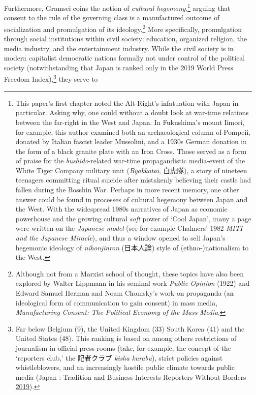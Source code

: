 \documentclass[10pt,british,A4paper,oneside]{memoir}
\begin{document}
Furthermore, Gramsci coins the notion of \emph{cultural
hegemony},\footnote{This paper's first chapter noted the Alt-Right's
  infatuation with Japan in particular. Asking why, one could without a
  doubt look at war-time relations between the far-right in the West and
  Japan. In Fukushima's mount Iimori, for example, this author examined
  both an archaeological column of Pompeii, donated by Italian fascist
  leader Mussolini, and a 1930s German donation in the form of a black
  granite plate with an Iron Cross. Those served as a form of praise for
  the \emph{bushido}-related war-time propagandistic media-event of the
  White Tiger Company military unit (\emph{Byakkotai}, 白虎隊), a story
  of nineteen teenagers committing ritual suicide after mistakenly
  believing their castle had fallen during the Bosshin War. Perhaps in
  more recent memory, one other answer could be found in processes of
  cultural hegemony between Japan and the West. With the widespread
  1980s narratives of Japan as economic powerhouse and the growing
  cultural \emph{soft} power of `Cool Japan', many a page were written
  on the \emph{Japanese model} (see for example Chalmers' 1982
  \emph{MITI and the Japanese Miracle}), and thus a window opened to
  sell Japan's hegemonic ideology of \emph{nihonjinron} (日本人論) style
  of (ethno-)nationalism to the West.} arguing that consent to the rule
of the governing class is a manufactured outcome of socialization and
promulgation of its ideology.\footnote{Although not from a Marxist
  school of thought, these topics have also been explored by Walter
  Lippmann in his seminal work \emph{Public Opinion} (1922) and Edward
  Samuel Herman and Noam Chomsky's work on propaganda (an ideological
  form of communication to gain consent) in mass media,
  \emph{Manufacturing Consent: The Political Economy of the Mass Media}.}
More specifically, promulgation through social institutions within civil
society: education, organized religion, the media industry, and the
entertainment industry. While the civil society is in modern capitalist
democratic nations formally not under control of the political society
(notwithstanding that Japan is ranked only  in the 2019 World
Press Freedom Index),\footnote{Far below Belgium (9), the United Kingdom
  (33) South Korea (41) and the United States (48). This ranking is
  based on among others restrictions of journalism in official press
  rooms (take, for example, the concept of the `reporters club,' the 記者クラブ \emph{kisha
  kurabu}), strict policies against whistleblowers, and an increasingly
  hostile public climate towards public media (Japan : Tradition and
  Business Interests Reporters Without Borders
  \protect\hyperlink{ref-noauthor_japan_2019}{2019}).} they serve to
\end{document}
